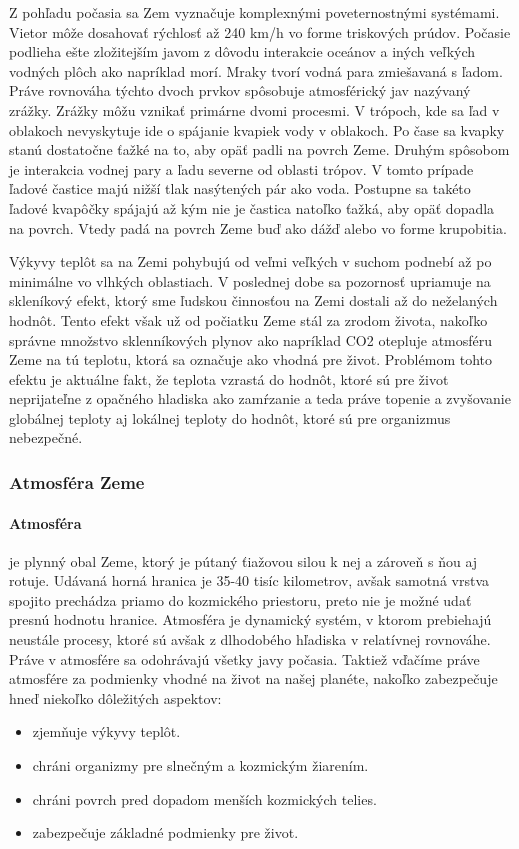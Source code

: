 Z pohľadu počasia sa Zem vyznačuje komplexnými poveternostnými systémami. Vietor môže dosahovať rýchlosť až 240 km/h vo forme triskových prúdov. Počasie podlieha ešte zložitejším javom z dôvodu interakcie oceánov a iných veľkých vodných plôch ako napríklad morí. Mraky tvorí vodná para zmiešavaná s ľadom. Práve rovnováha týchto dvoch prvkov spôsobuje atmosférický jav nazývaný zrážky. Zrážky môžu vznikať primárne dvomi procesmi. V trópoch, kde sa ľad v oblakoch nevyskytuje ide o spájanie kvapiek vody v oblakoch. Po čase sa kvapky stanú dostatočne ťažké na to, aby opäť padli na povrch Zeme. Druhým spôsobom je interakcia vodnej pary a ľadu severne od oblasti trópov. V tomto prípade ľadové častice majú nižší tlak nasýtených pár ako voda. Postupne sa takéto ľadové kvapôčky spájajú až kým nie je častica natoľko ťažká, aby opäť dopadla na povrch. Vtedy padá na povrch Zeme buď ako dážď alebo vo forme krupobitia.

Výkyvy teplôt sa na Zemi pohybujú od veľmi veľkých v suchom podnebí až po minimálne vo vlhkých oblastiach. V poslednej dobe sa pozornosť upriamuje na skleníkový efekt, ktorý sme ľudskou činnosťou na Zemi dostali až do neželaných hodnôt. Tento efekt však už od počiatku Zeme stál za zrodom života, nakoľko správne množstvo sklenníkových plynov ako napríklad CO2 otepluje atmosféru Zeme na tú teplotu, ktorá sa označuje ako vhodná pre život. Problémom tohto efektu je aktuálne fakt, že teplota vzrastá do hodnôt, ktoré sú pre život neprijateľne z opačného hladiska ako zamŕzanie a teda práve topenie a zvyšovanie globálnej teploty aj lokálnej teploty do hodnôt, ktoré sú pre organizmus nebezpečné.

\subsubsection{Atmosféra Zeme}
\label{atmosferaZeme}
\paragraph{Atmosféra}je plynný obal Zeme, ktorý je pútaný ťiažovou silou k nej a zároveň s ňou aj rotuje. Udávaná horná hranica je 35-40 tisíc kilometrov, avšak samotná vrstva spojito prechádza priamo do kozmického priestoru, preto nie je možné udať presnú hodnotu hranice. Atmosféra je dynamický systém, v ktorom prebiehajú neustále procesy, ktoré sú avšak z dlhodobého hľadiska v relatívnej rovnováhe. Práve v atmosfére sa odohrávajú všetky javy počasia. Taktiež vďačíme práve atmosfére za podmienky vhodné na život na našej planéte, nakoľko zabezpečuje hneď niekoľko dôležitých aspektov:
\begin{itemize}
  \item zjemňuje výkyvy teplôt.
  \item chráni organizmy pre slnečným a kozmickým žiarením.
  \item chráni povrch pred dopadom menších kozmických telies.
  \item zabezpečuje základné podmienky pre život.
\end{itemize}

